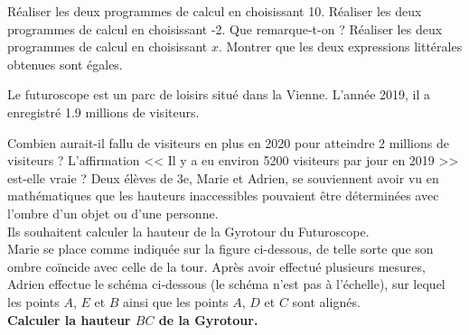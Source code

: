\documentclass[../Cours.tex]{subfiles}
\begin{document}
\begin{questions}
\question 
    \subquestion Réaliser les deux programmes de calcul en choisissant 10.
    \subquestion Réaliser les deux programmes de calcul en choisissant -2.
\question Que remarque-t-on ?
\question 
    \subquestion Réaliser les deux programmes de calcul en choisissant $x$.
    \subquestion Montrer que les deux expressions littérales obtenues sont égales.

Le futuroscope est un parc de loisirs situé dans la Vienne. L'année 2019, il a enregistré \num{1.9} millions de visiteurs.

\question Combien aurait-il fallu de visiteurs en plus en 2020 pour atteindre 2 millions de visiteurs ?
\question L'affirmation << Il y a eu environ \num{5200} visiteurs par jour en 2019 >> est-elle vraie ?
\question Deux élèves de 3e, Marie et Adrien, se souviennent avoir vu en mathématiques que les hauteurs inaccessibles pouvaient être déterminées avec l’ombre d'un objet ou d'une personne. \\
Ils souhaitent calculer la hauteur de la Gyrotour du Futuroscope.\\
Marie se place comme indiquée sur la figure ci-dessous, de telle sorte que son ombre coïncide avec celle de la tour. Après avoir effectué plusieurs mesures, Adrien effectue le schéma ci-dessous (le schéma n’est pas à l’échelle), sur lequel les points $A$, $E$ et $B$ ainsi que les points $A$, $D$ et $C$ sont alignés. \\
\textbf{Calculer la hauteur $BC$ de la Gyrotour.}

\begin{center}
\end{center}


\end{questions}
\end{document}
